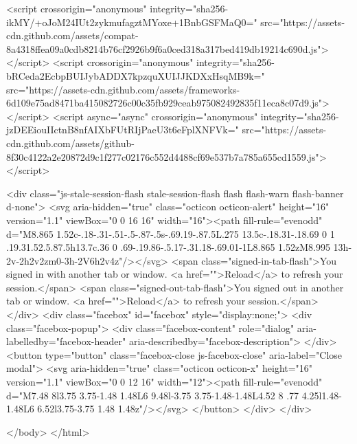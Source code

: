     <script crossorigin="anonymous" integrity="sha256-ikMY/+oJoM24IUt2zykmufagztMYoxe+1BnbGSFMaQ0=" src="https://assets-cdn.github.com/assets/compat-8a4318ffea09a0cdb8214b76cf2926b9f6a0ced318a317bed419db19214c690d.js"></script>
    <script crossorigin="anonymous" integrity="sha256-bRCeda2EcbpBUIJybADDX7kpzquXUIJJKDXxHsqMB9k=" src="https://assets-cdn.github.com/assets/frameworks-6d109e75ad8471ba415082726c00c35fb929ceab975082492835f11eca8c07d9.js"></script>
    <script async="async" crossorigin="anonymous" integrity="sha256-jzDEEiouIIctnB8nfAIXbFUtRIjPaeU3t6eFplXNFVk=" src="https://assets-cdn.github.com/assets/github-8f30c4122a2e20872d9c1f277c02176c552d4488cf69e537b7a785a655cd1559.js"></script>
    
    
    
    
  <div class="js-stale-session-flash stale-session-flash flash flash-warn flash-banner d-none">
    <svg aria-hidden="true" class="octicon octicon-alert" height="16" version="1.1" viewBox="0 0 16 16" width="16"><path fill-rule="evenodd" d="M8.865 1.52c-.18-.31-.51-.5-.87-.5s-.69.19-.87.5L.275 13.5c-.18.31-.18.69 0 1 .19.31.52.5.87.5h13.7c.36 0 .69-.19.86-.5.17-.31.18-.69.01-1L8.865 1.52zM8.995 13h-2v-2h2v2zm0-3h-2V6h2v4z"/></svg>
    <span class="signed-in-tab-flash">You signed in with another tab or window. <a href="">Reload</a> to refresh your session.</span>
    <span class="signed-out-tab-flash">You signed out in another tab or window. <a href="">Reload</a> to refresh your session.</span>
  </div>
  <div class="facebox" id="facebox" style="display:none;">
  <div class="facebox-popup">
    <div class="facebox-content" role="dialog" aria-labelledby="facebox-header" aria-describedby="facebox-description">
    </div>
    <button type="button" class="facebox-close js-facebox-close" aria-label="Close modal">
      <svg aria-hidden="true" class="octicon octicon-x" height="16" version="1.1" viewBox="0 0 12 16" width="12"><path fill-rule="evenodd" d="M7.48 8l3.75 3.75-1.48 1.48L6 9.48l-3.75 3.75-1.48-1.48L4.52 8 .77 4.25l1.48-1.48L6 6.52l3.75-3.75 1.48 1.48z"/></svg>
    </button>
  </div>
</div>


  </body>
</html>

